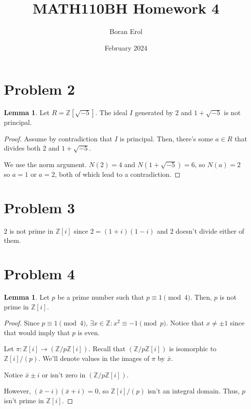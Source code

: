 \documentclass{article}
\title{MATH110BH Homework 4}
\date{February 2024}
\author{Boran Erol}
\theoremstyle{definition}
\newtheorem{lemma}[theorem]{Lemma}
\begin{document}
\maketitle



\section{Problem 2}

\begin{lemma}
    Let $R = \mathbb{Z}[\sqrt{-5}]$. The ideal $I$ generated by $ 2 $ and $ 1 + \sqrt{-5} $ is not principal.
\end{lemma}
\begin{proof}
    Assume by contradiction that $ I $ is principal. Then, there's some $ a \in R $ that divides both $ 2 $ and $ 1 + \sqrt{-5} $.

    We use the norm argument. $ N(2) = 4 $ and $ N(1 + \sqrt{-5}) = 6 $, so $ N(a) = 2 $ so $ a = 1 $ or $ a = 2 $,
    both of which lead to a contradiction. 
\end{proof}

\newpage

\section{Problem 3}

$ 2 $ is not prime in $ \mathbb{Z}[i] $ since $ 2 = (1 + i)(1 - i) $ and $ 2 $ doesn't divide either of them.

\newpage

\section{Problem 4}

\begin{lemma}
    Let $p$ be a prime number such that $p \equiv 1 \pmod{4}$. Then, $p$ is not prime in $\mathbb{Z}[i]$.
\end{lemma}
\begin{proof}
    Since $p \equiv 1 \pmod{4}$, $\exists x \in \mathbb{Z}: x^{2} \equiv -1 \pmod{p} $.
    Notice that $ x \neq \pm 1 $ since that would imply that $ p $ is even.

    Let $ \pi: \mathbb{Z}[i] \xrightarrow{} (\mathbb{Z}/p\mathbb{Z}[i]) $.
    Recall that $ (\mathbb{Z}/p\mathbb{Z}[i]) $ is isomorphic to $ \mathbb{Z}[i] / (p) $.
    We'll denote values in the images of $ \pi $ by $ \bar{x} $.

    Notice $ \bar{x} \pm i$ or  isn't zero in $ (\mathbb{Z}/p\mathbb{Z}[i]) $.

    However, $ (\bar{x} - i)( \bar{x} + i) = 0$, so  $ \mathbb{Z}[i] / (p) $ isn't an integral domain.
    Thus, $ p $ isn't prime in $ \mathbb{Z}[i] $.
\end{proof}
\end{document}

